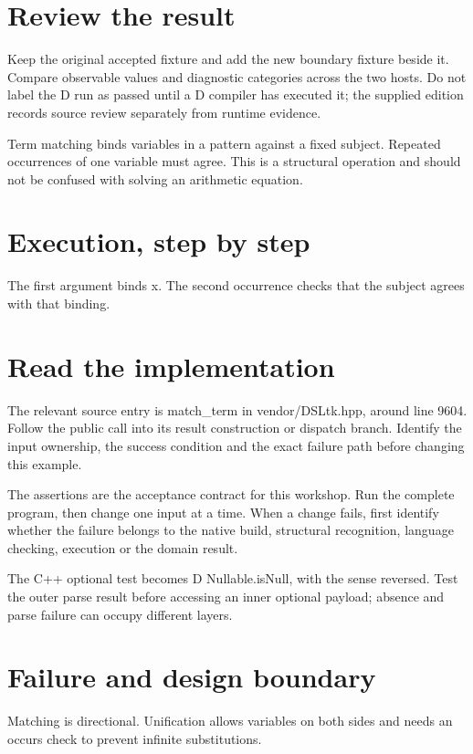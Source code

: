 \section*{Review the result}
Keep the original accepted fixture and add the new boundary fixture beside it. Compare observable values and diagnostic categories across the two hosts. Do not label the D run as passed until a D compiler has executed it; the supplied edition records source review separately from runtime evidence.

\clearpage
{}
Term matching binds variables in a pattern against a fixed subject. Repeated occurrences of one variable must agree. This is a structural operation and should not be confused with solving an arithmetic equation.


\section*{Execution, step by step}
The first argument binds x. The second occurrence checks that the subject agrees with that binding.

\section*{Read the implementation}
The relevant source entry is match\_term in vendor/DSLtk.hpp, around line 9604. Follow the public call into its result construction or dispatch branch. Identify the input ownership, the success condition and the exact failure path before changing this example.

The assertions are the acceptance contract for this workshop. Run the complete program, then change one input at a time. When a change fails, first identify whether the failure belongs to the native build, structural recognition, language checking, execution or the domain result.

\clearpage
{}
The C++ optional test becomes D Nullable.isNull, with the sense reversed. Test the outer parse result before accessing an inner optional payload; absence and parse failure can occupy different layers.


\section*{Failure and design boundary}
Matching is directional. Unification allows variables on both sides and needs an occurs check to prevent infinite substitutions.

